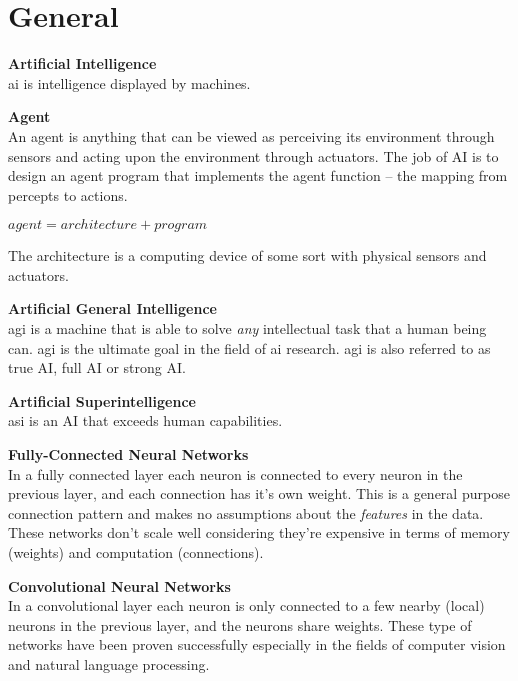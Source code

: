 \section{General}

\textbf{Artificial Intelligence} \\
\acrfull{ai} is intelligence displayed by machines. 

\textbf{Agent} \\
An agent is anything that can be viewed as perceiving its environment through sensors and acting upon the environment through actuators. The job of AI is to design an agent program that implements the agent function – the mapping from percepts to actions. \\
\centerline{$agent = architecture + program$}
The architecture is a computing device of some sort with physical sensors and actuators. 

\textbf{Artificial General Intelligence} \\
\acrfull{agi} is a machine that is able to solve \textit{any} intellectual task that a human being can. \acrshort{agi} is the ultimate goal in the field of \acrshort{ai} research. \acrshort{agi} is also referred to as true AI, full AI or strong AI. 

\textbf{Artificial Superintelligence} \\
\acrfull{asi} is an AI that exceeds human capabilities.

\textbf{Fully-Connected Neural Networks} \\
In a fully connected layer each neuron is connected to every neuron in the previous layer, and each connection has it's own weight. This is a general purpose connection pattern and makes no assumptions about the \textit{features} in the data. These networks don't scale well considering they're expensive in terms of memory (weights) and computation (connections).


\textbf{Convolutional Neural Networks} \\
In a convolutional layer each neuron is only connected to a few nearby (local) neurons in the previous layer, and the neurons share weights. These type of networks have been proven successfully especially in the fields of computer vision and natural language processing. 


